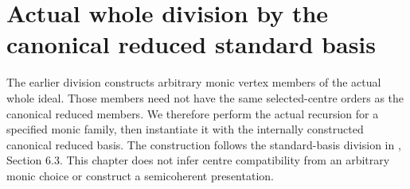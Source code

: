 \section{Actual whole division by the canonical reduced standard basis}

The earlier division constructs arbitrary monic vertex members of the actual
whole ideal. Those members need not have the same selected-centre orders as
the canonical reduced members. We therefore perform the actual recursion for
a specified monic family, then instantiate it with the internally constructed
canonical reduced basis. The construction follows the standard-basis division
in \cite{bierstone-milman03-desingularization-algorithms}, Section 6.3. This chapter does not infer centre compatibility
from an arbitrary monic choice or construct a semicoherent presentation.

